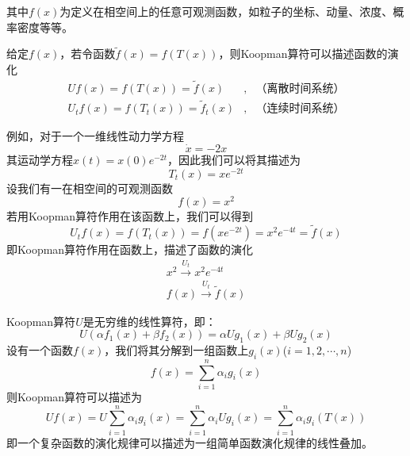 其中$f(x)$为定义在相空间上的任意可观测函数，如粒子的坐标、动量、浓度、概率密度等等。

给定$f(x)$，若令函数$\tilde{f}(x)=f(T(x))$，则Koopman算符可以描述函数的演化
\begin{equation}
    \begin{aligned}
        Uf(x)=f(T(x))=\tilde{f}(x)       &,&\text{（离散时间系统）}\\
        U_tf(x)=f(T_t(x))=\tilde{f}_t(x) &,&\text{（连续时间系统）}
    \end{aligned}
\end{equation}

例如，对于一个一维线性动力学方程
\begin{equation}
    \dot{x}=-2x
\end{equation}
其运动学方程$x(t)=x(0)e^{-2t}$，因此我们可以将其描述为
\begin{equation}
    T_t(x)=xe^{-2t}
\end{equation}
设我们有一在相空间的可观测函数
\begin{equation}
    f(x)=x^2
\end{equation}
若用Koopman算符作用在该函数上，我们可以得到
\begin{equation}
    U_tf(x)=f(T_t(x))=f(xe^{-2t})=x^2e^{-4t}=\tilde{f}(x)
\end{equation}
即Koopman算符作用在函数上，描述了函数的演化
\begin{equation}
    \begin{aligned}
        x^2 \stackrel{U_t}{\longrightarrow} x^2e^{-4t} \\
        f(x) \stackrel{U_t}{\longrightarrow} \tilde{f}(x)
    \end{aligned}
\end{equation}

Koopman算符$U$是无穷维的线性算符，即：
\begin{equation}
    U(\alpha f_1(x)+\beta f_2(x))=\alpha Ug_1(x)+\beta Ug_2(x)
\end{equation}
设有一个函数$f(x)$，我们将其分解到一组函数上$g_i(x)$($i=1,2,\cdots,n$)
\begin{equation}
    f(x)=\sum_{i=1}^n\alpha_ig_i(x)
\end{equation}
则Koopman算符可以描述为
\begin{equation}
    Uf(x)=U\sum_{i=1}^n\alpha_ig_i(x)=\sum_{i=1}^n\alpha_iUg_i(x)=\sum_{i=1}^n\alpha_ig_i(T(x))
\end{equation}
即一个复杂函数的演化规律可以描述为一组简单函数演化规律的线性叠加。

